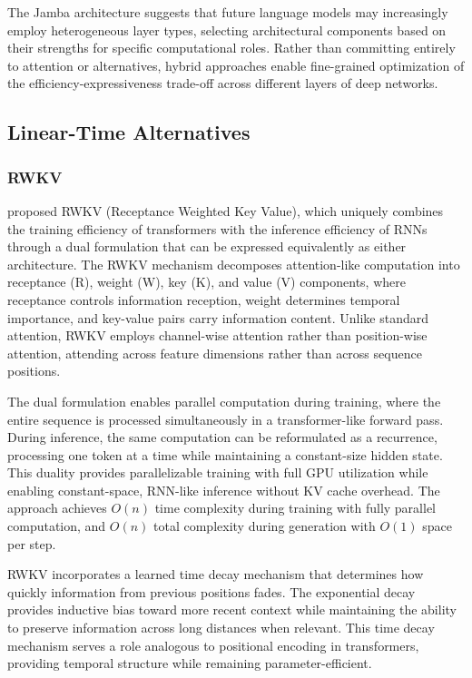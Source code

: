 \documentclass[11pt,letterpaper]{article}
\begin{document}
The Jamba architecture suggests that future language models may increasingly employ heterogeneous layer types, selecting architectural components based on their strengths for specific computational roles. Rather than committing entirely to attention or alternatives, hybrid approaches enable fine-grained optimization of the efficiency-expressiveness trade-off across different layers of deep networks.

\subsection{Linear-Time Alternatives}

\subsubsection{RWKV}

\cite{peng2023rwkv} proposed RWKV (Receptance Weighted Key Value), which uniquely combines the training efficiency of transformers with the inference efficiency of RNNs through a dual formulation that can be expressed equivalently as either architecture. The RWKV mechanism decomposes attention-like computation into receptance (R), weight (W), key (K), and value (V) components, where receptance controls information reception, weight determines temporal importance, and key-value pairs carry information content. Unlike standard attention, RWKV employs channel-wise attention rather than position-wise attention, attending across feature dimensions rather than across sequence positions.

The dual formulation enables parallel computation during training, where the entire sequence is processed simultaneously in a transformer-like forward pass. During inference, the same computation can be reformulated as a recurrence, processing one token at a time while maintaining a constant-size hidden state. This duality provides parallelizable training with full GPU utilization while enabling constant-space, RNN-like inference without KV cache overhead. The approach achieves $O(n)$ time complexity during training with fully parallel computation, and $O(n)$ total complexity during generation with $O(1)$ space per step.

RWKV incorporates a learned time decay mechanism that determines how quickly information from previous positions fades. The exponential decay provides inductive bias toward more recent context while maintaining the ability to preserve information across long distances when relevant. This time decay mechanism serves a role analogous to positional encoding in transformers, providing temporal structure while remaining parameter-efficient.
\end{document}
